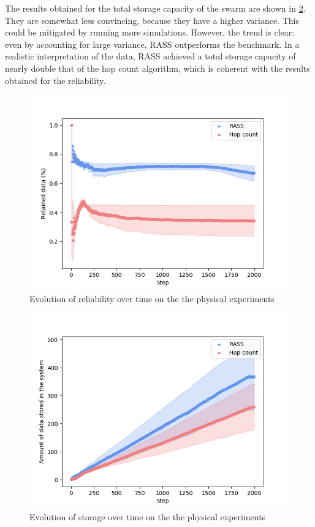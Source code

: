 The results obtained for the total storage capacity of the swarm are shown in \ref{results:physicalStorage}. They are somewhat less convincing, because they have a higher variance. This could be mitigated by running more simulations. However, the trend is clear: even by accounting for large variance, \ac{RASS} outperforms the benchmark. In a realistic interpretation of the data, \ac{RASS} achieved a total storage capacity of nearly double that of the hop count algorithm, which is coherent with the results obtained for the reliability.

\begin{figure}[htbp]
	\centering
    \includegraphics[width=\columnwidth]{figures/dora_mesh/reliability.png}
    \caption[RASS physical reliability]{Evolution of reliability over time on the the physical experiments}
    \label{results:physicalRelaibility}
\end{figure}

\begin{figure}[htbp]
	\centering
    \includegraphics[width=\columnwidth]{figures/dora_mesh/storage.png}
    \caption[RASS physical storage]{Evolution of storage over time on the the physical experiments}
    \label{results:physicalStorage}
\end{figure}

